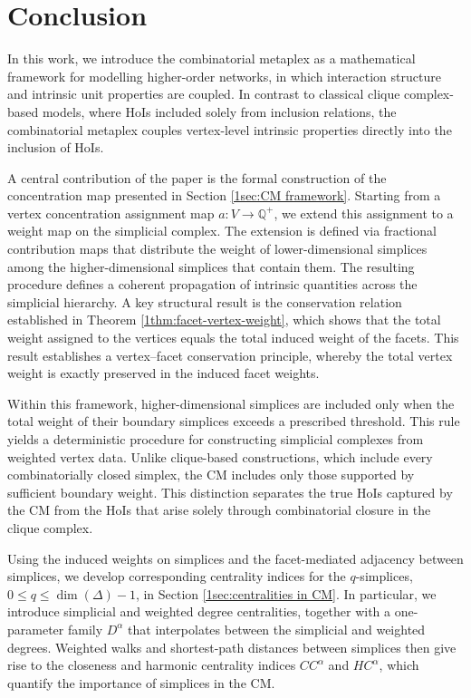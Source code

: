 \documentclass[12pt]{article}
\theoremstyle{normalhead_nobrackets}
\theoremstyle{exampstyle}
\begin{document}
\section{Conclusion}

In this work, we introduce the combinatorial metaplex as a mathematical framework for modelling higher-order networks, in which interaction structure and intrinsic unit properties are coupled. In contrast to classical clique complex-based models, where HoIs included solely from inclusion relations, the combinatorial metaplex couples vertex-level intrinsic properties directly into the inclusion of HoIs.

A central contribution of the paper is the formal construction of the concentration map presented in Section \ref{1sec:CM framework}. Starting from a vertex concentration assignment map $a:V\to\mathbb{Q}^+$, we extend this assignment to a weight map on the simplicial complex. The extension is defined via fractional contribution maps that distribute the weight of lower-dimensional simplices among the higher-dimensional simplices that contain them. The resulting procedure defines a coherent propagation of intrinsic quantities across the simplicial hierarchy. A key structural result is the conservation relation established in Theorem \ref{1thm:facet-vertex-weight}, which shows that the total weight assigned to the vertices equals the total induced weight of the facets. This result establishes a vertex–facet conservation principle, whereby the total vertex weight is exactly preserved in the induced facet weights.

Within this framework, higher-dimensional simplices are included only when the total weight of their boundary simplices exceeds a prescribed threshold. This rule yields a deterministic procedure for constructing simplicial complexes from weighted vertex data. Unlike clique-based constructions, which include every combinatorially closed simplex, the CM includes only those supported by sufficient boundary weight. This distinction separates the true HoIs captured by the CM from the HoIs that arise solely through combinatorial closure in the clique complex.

Using the induced weights on simplices and the facet-mediated adjacency between simplices, we develop corresponding centrality indices for the $q$-simplices, $0 \le q \le \dim(\Delta)-1$, in Section \ref{1sec:centralities in CM}. In particular, we introduce simplicial and weighted degree centralities, together with a one-parameter family $D^{\alpha}$ that interpolates between the simplicial and weighted degrees. Weighted walks and shortest-path distances between simplices then give rise to the closeness and harmonic centrality indices $CC^{\alpha}$ and $HC^{\alpha}$, which quantify the importance of simplices in the CM.
\end{document}
